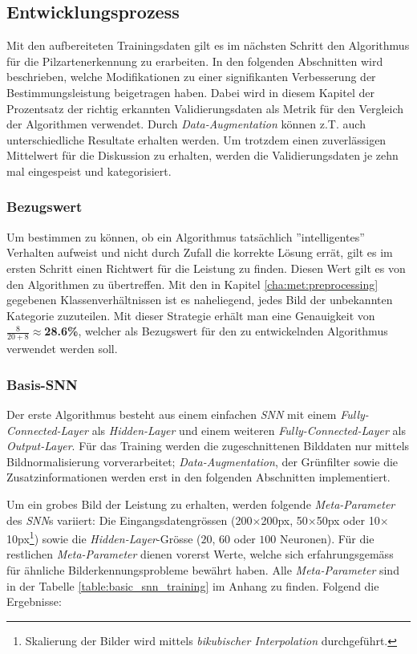 \subsection{Entwicklungsprozess}\label{cha:met:dev}
Mit den aufbereiteten Trainingsdaten gilt es im nächsten Schritt den Algorithmus für die Pilzartenerkennung zu erarbeiten. In den folgenden Abschnitten wird beschrieben, welche Modifikationen zu einer signifikanten Verbesserung der Bestimmungsleistung beigetragen haben. Dabei wird in diesem Kapitel der Prozentsatz der richtig erkannten Validierungsdaten als Metrik für den Vergleich der Algorithmen verwendet. Durch \textit{Data-Augmentation} können z.T. auch unterschiedliche Resultate erhalten werden. Um trotzdem einen zuverlässigen Mittelwert für die Diskussion zu erhalten, werden die Validierungsdaten je zehn mal eingespeist und kategorisiert.

\subsubsection{Bezugswert}
Um bestimmen zu können, ob ein Algorithmus tatsächlich ''intelligentes'' Verhalten aufweist und nicht durch Zufall die korrekte Lösung errät, gilt es im ersten Schritt einen Richtwert für die Leistung zu finden. Diesen Wert gilt es von den Algorithmen zu übertreffen.
Mit den in Kapitel \ref{cha:met:preprocessing} gegebenen Klassenverhältnissen ist es naheliegend, jedes Bild der unbekannten Kategorie zuzuteilen. Mit dieser Strategie erhält man eine Genauigkeit von $\frac{8}{20+8} \approx$\textbf{28.6\%}, welcher als Bezugswert für den zu entwickelnden Algorithmus verwendet werden soll.

\subsubsection{Basis-SNN}
Der erste Algorithmus besteht aus einem einfachen \textit{SNN} mit einem \textit{Fully-Connected-Layer} als \textit{Hidden-Layer} und einem weiteren \textit{Fully-Connected-Layer} als \textit{Output-Layer}. Für das Training werden die zugeschnittenen Bilddaten nur mittels Bildnormalisierung vorverarbeitet; \textit{Data-Augmentation}, der Grünfilter sowie die Zusatzinformationen werden erst in den folgenden Abschnitten implementiert.

Um ein grobes Bild der Leistung zu erhalten, werden folgende \textit{Meta-Parameter} des \textit{SNN}s variiert: Die Eingangsdatengrössen (200$\times$200px, 50$\times$50px oder 10$\times$10px\footnote{Skalierung der Bilder wird mittels \textit{bikubischer Interpolation} durchgeführt.}) sowie die \textit{Hidden-Layer}-Grösse ($20$, $60$ oder $100$ Neuronen). Für die restlichen \textit{Meta-Parameter} dienen vorerst Werte, welche sich erfahrungsgemäss für ähnliche Bilderkennungsprobleme bewährt haben. Alle \textit{Meta-Parameter} sind in der Tabelle \ref{table:basic_snn_training} im Anhang zu finden. Folgend die Ergebnisse:

